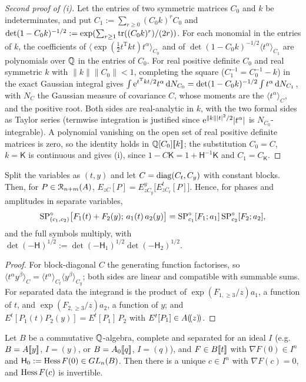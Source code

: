 \begin{proof}[Second proof of (i)]
Let the entries of two symmetric matrices $C_0$ and $k$ be indeterminates, and put $C_1:=\sum_{r\geq0}(C_0k)^rC_0$ and $\det(1-C_0k)^{-1/2}:=\exp(\sum_{r\geq1}\operatorname{tr}((C_0k)^r)/(2r))$. For each monomial in the entries of $k$, the coefficients of $\langle\exp(\frac12t^{\mathrm T}kt)t^\alpha\rangle_{C_0}$ and of $\det(1-C_0k)^{-1/2}\langle t^\alpha\rangle_{C_1}$ are polynomials over $\mathbb{Q}$ in the entries of $C_0$. For real positive definite $C_0$ and real symmetric $k$ with $\|k\|\|C_0\|<1$, completing the square ($C_1^{-1}=C_0^{-1}-k$) in the exact Gaussian integral gives $\int\mathrm{e}^{t^{\mathrm T}kt/2}t^\alpha\,\mathrm{d} N_{C_0}=\det(1-C_0k)^{-1/2}\int t^\alpha\,\mathrm{d} N_{C_1}$, with $N_C$ the Gaussian measure of covariance $C$, whose moments are the $\langle t^\alpha\rangle_C$, and the positive root. Both sides are real-analytic in $k$, with the two formal sides as Taylor series (termwise integration is justified since $\mathrm{e}^{\|k\||t|^2/2}|t^\alpha|$ is $N_{C_0}$-integrable). A polynomial vanishing on the open set of real positive definite matrices is zero, so the identity holds in $\mathbb{Q}[C_0][\![ k ]\!]$; the substitution $C_0=C$, $k=\mathsf K$ is continuous and gives (i), since $1-C\mathsf K=1+\mathsf H^{-1}\mathsf K$ and $C_1=C_{\mathsf K}$.
\end{proof}

\begin{lem}[Products]
\label{lem:fsp-prod}
Split the variables as $(t,y)$ and let $C=\operatorname{diag}(C_t,C_y)$ with constant blocks. Then, for $P\in\mathcal{R}_{n+m}(A)$, $E_{zC}[P]=E^y_{zC_y}\bigl[E^t_{zC_t}[P]\bigr]$. Hence, for phases and amplitudes in separate variables,
\[
\mathrm{SP}^{\circ}_{(c_1,c_2)}\bigl[F_1(t)+F_2(y);\,a_1(t)\,a_2(y)\bigr]=\mathrm{SP}^{\circ}_{c_1}[F_1;a_1]\,\mathrm{SP}^{\circ}_{c_2}[F_2;a_2],
\]
and the full symbols multiply, with $\det(-\mathsf H)^{1/2}:=\det(-\mathsf H_1)^{1/2}\det(-\mathsf H_2)^{1/2}$.
\end{lem}

\begin{proof}
For block-diagonal $C$ the generating function factorises, so $\langle t^\alpha y^\beta\rangle_C=\langle t^\alpha\rangle_{C_t}\langle y^\beta\rangle_{C_y}$; both sides are linear and compatible with summable sums. For separated data the integrand is the product of $\exp(F_{1,\geq3}/z)a_1$, a function of $t$, and $\exp(F_{2,\geq3}/z)a_2$, a function of $y$; and $E^t[P_1(t)P_2(y)]=E^t[P_1]\,P_2$ with $E^t[P_1]\in A(\!(z)\!)$.
\end{proof}

\begin{lem}
\label{lem:fsp-ift}
Let $B$ be a commutative $\mathbb{Q}$-algebra, complete and separated for an ideal $I$ (e.g.\ $B=A[\![ y ]\!]$, $I=(y)$, or $B=A_0[\![ q ]\!]$, $I=(q)$), and $F\in B[\![ t ]\!]$ with $\nabla F(0)\in I^n$ and $\mathsf H_0:=\operatorname{Hess} F(0)\in GL_n(B)$. Then there is a unique $c\in I^n$ with $\nabla F(c)=0$, and $\operatorname{Hess} F(c)$ is invertible.
\end{lem}

